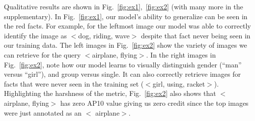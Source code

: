 \documentclass[runningheads]{llncs}
\begin{document}
Qualitative results are shown in Fig.~\ref{fig:ex1},~\ref{fig:ex2} (with many more in the supplementary).  In Fig.~\ref{fig:ex1}, our model's ability to generalize can be seen in the red facts.  For example, for the leftmost image our model was able to correctly identify the image as $<$dog, riding, wave$>$ despite that fact never being seen in our training data.  The left images in Fig.~\ref{fig:ex2} show the variety of images we can retrieve for the query $<$airplane, flying$>$.  In the right images in Fig.~\ref{fig:ex2}, note how our model learns to visually distinguish gender (``man'' versus ``girl''), and group versus single. It can also correctly retrieve images for facts that were never seen in the training set ($<$girl, using, racket$>$). Highlighting the harshness of the metric, Fig.~\ref{fig:ex2} also shows that   $<$airplane, flying$>$ has zero AP10 value giving us zero credit since the top images were just annotated as an $<$ airplane$>$.
\end{document}
